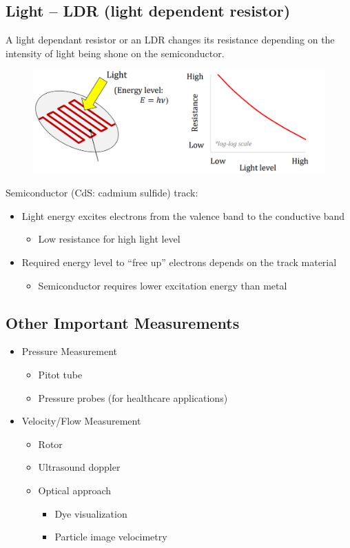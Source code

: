 \documentclass[class=report, crop=false, 12pt,a4paper]{standalone}
\begin{document}
\subsection{Light – LDR (light dependent resistor)}
A light dependant resistor or an LDR changes its resistance depending on the intensity of light being shone on the semiconductor.
\begin{figure}[H]
  \centering
  \includegraphics[width = 1 \textwidth]{../img/Mdiagram56.png}
\end{figure}
Semiconductor (CdS: cadmium sulfide) track:
\begin{itemize}
  \item Light energy excites electrons from the valence band to the conductive band
  \begin{itemize}
    \item Low resistance for high light level
  \end{itemize}
  \item Required energy level to “free up”
  electrons depends on the track material
  \begin{itemize}
    \item Semiconductor requires lower excitation energy than metal
  \end{itemize}
\end{itemize}
\subsection{Other Important Measurements}
\begin{itemize}
  \item Pressure Measurement
  \begin{itemize}
    \item Pitot tube
    \item Pressure probes (for healthcare applications)
  \end{itemize}
  \item Velocity/Flow Measurement
  \begin{itemize}
    \item Rotor
    \item Ultrasound doppler
    \item Optical approach
    \begin{itemize}
      \item Dye visualization
      \item Particle image velocimetry
    \end{itemize}
  \end{itemize}
\end{itemize}
\end{document}
